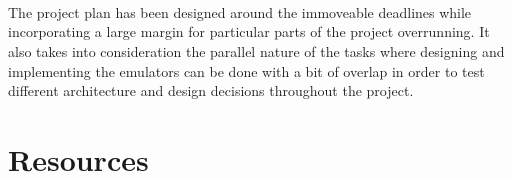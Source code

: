 \documentclass{article}
\begin{document}
\begin{center}
\begin{ganttchart}{1}{23}
   \\
   \\
 \\
 \ganttnewline
{} \ganttnewline
{} \ganttnewline
{} \ganttnewline
{} \ganttnewline
{} \ganttnewline
{} \ganttnewline
{}
\end{ganttchart}
\end{center}

The project plan has been designed around the immoveable deadlines while incorporating a large margin for particular 
parts of the project overrunning. It also takes into consideration the parallel nature of the tasks where designing 
and implementing the emulators can be done with a bit of overlap in order to test different architecture and design 
decisions throughout the project.

\section{Resources}

% 




\end{document}
